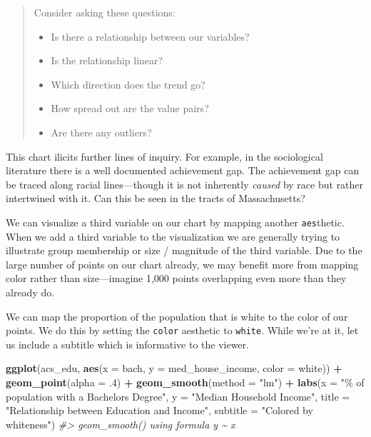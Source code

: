 \documentclass[
]{book}
\newenvironment{Shaded}{\begin{snugshade}}{\end{snugshade}}
\newcommand{\CommentTok}[1]{\textcolor[rgb]{0.56,0.35,0.01}{\textit{#1}}}
\newcommand{\DataTypeTok}[1]{\textcolor[rgb]{0.13,0.29,0.53}{#1}}
\newcommand{\FloatTok}[1]{\textcolor[rgb]{0.00,0.00,0.81}{#1}}
\newcommand{\KeywordTok}[1]{\textcolor[rgb]{0.13,0.29,0.53}{\textbf{#1}}}
\newcommand{\NormalTok}[1]{#1}
\newcommand{\OperatorTok}[1]{\textcolor[rgb]{0.81,0.36,0.00}{\textbf{#1}}}
\newcommand{\StringTok}[1]{\textcolor[rgb]{0.31,0.60,0.02}{#1}}
\providecommand{\tightlist}{%
  \setlength{\itemsep}{0pt}\setlength{\parskip}{0pt}}
\begin{document}
\begin{quote}
Consider asking these questions:

\begin{itemize}
\tightlist
\item
  Is there a relationship between our variables?
\item
  Is the relationship linear?
\item
  Which direction does the trend go?
\item
  How spread out are the value pairs?
\item
  Are there any outliers?
\end{itemize}
\end{quote}

This chart ilicits further lines of inquiry. For example, in the sociological literature there is a well documented achievement gap. The achievement gap can be traced along racial lines---though it is not inherently \emph{caused} by race but rather intertwined with it. Can this be seen in the tracts of Massachusetts?

We can visualize a third variable on our chart by mapping another \texttt{aes}thetic. When we add a third variable to the visualization we are generally trying to illustrate group membership or size / magnitude of the third variable. Due to the large number of points on our chart already, we may benefit more from mapping color rather than size---imagine 1,000 points overlapping even more than they already do.

We can map the proportion of the population that is white to the color of our points. We do this by setting the \texttt{color} aesthetic to \texttt{white}. While we're at it, let us include a subtitle which is informative to the viewer.

\begin{Shaded}
\begin{Highlighting}[]
\KeywordTok{ggplot}\NormalTok{(acs\_edu, }\KeywordTok{aes}\NormalTok{(}\DataTypeTok{x =}\NormalTok{ bach, }\DataTypeTok{y =}\NormalTok{ med\_house\_income, }\DataTypeTok{color =}\NormalTok{ white)) }\OperatorTok{+}
\StringTok{  }\KeywordTok{geom\_point}\NormalTok{(}\DataTypeTok{alpha =} \FloatTok{.4}\NormalTok{) }\OperatorTok{+}
\StringTok{  }\KeywordTok{geom\_smooth}\NormalTok{(}\DataTypeTok{method =} \StringTok{"lm"}\NormalTok{) }\OperatorTok{+}\StringTok{ }
\StringTok{  }\KeywordTok{labs}\NormalTok{(}\DataTypeTok{x =} \StringTok{"\% of population with a Bachelor\textquotesingle{}s Degree"}\NormalTok{,}
       \DataTypeTok{y =} \StringTok{"Median Household Income"}\NormalTok{,}
       \DataTypeTok{title =} \StringTok{"Relationship between Education and Income"}\NormalTok{,}
       \DataTypeTok{subtitle =} \StringTok{"Colored by whiteness"}\NormalTok{) }
\CommentTok{\#\textgreater{} \textasciigrave{}geom\_smooth()\textasciigrave{} using formula \textquotesingle{}y \textasciitilde{} x\textquotesingle{}}
\end{Highlighting}
\end{Shaded}
\end{document}
